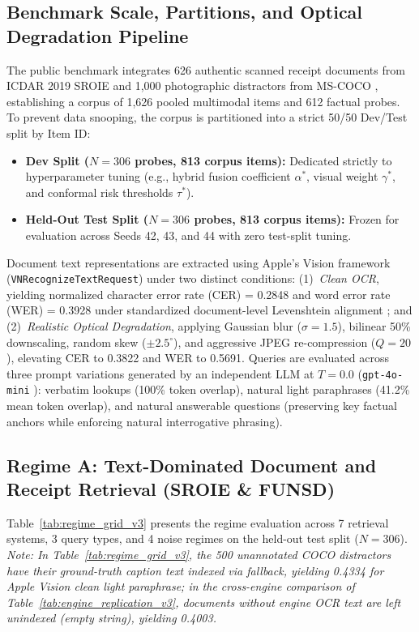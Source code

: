 \documentclass[conference]{IEEEtran}
\begin{document}
\subsection{Benchmark Scale, Partitions, and Optical Degradation Pipeline}
The public benchmark integrates 626 authentic scanned receipt documents from ICDAR 2019 SROIE \cite{huang2019sroie} and 1,000 photographic distractors from MS-COCO \cite{lin2014coco}, establishing a corpus of 1,626 pooled multimodal items and 612 factual probes. To prevent data snooping, the corpus is partitioned into a strict 50/50 Dev/Test split by Item ID:
\begin{itemize}
    \setlength{\itemsep}{0.2pt plus 0.1pt}
    \setlength{\parskip}{0pt}
    \item \textbf{Dev Split ($N=306$ probes, 813 corpus items):} Dedicated strictly to hyperparameter tuning (e.g., hybrid fusion coefficient $\alpha^*$, visual weight $\gamma^*$, and conformal risk thresholds $\tau^*$).
    \item \textbf{Held-Out Test Split ($N=306$ probes, 813 corpus items):} Frozen for evaluation across Seeds 42, 43, and 44 with zero test-split tuning.
\end{itemize}

Document text representations are extracted using Apple's Vision framework (\texttt{VNRecognizeTextRequest}) under two distinct conditions: (1)~\emph{Clean OCR}, yielding normalized character error rate (CER) = 0.2848 and word error rate (WER) = 0.3928 under standardized document-level Levenshtein alignment \cite{vaessen2024jiwer}; and (2)~\emph{Realistic Optical Degradation}, applying Gaussian blur ($\sigma=1.5$), bilinear 50\% downscaling, random skew ($\pm 2.5^\circ$), and aggressive JPEG re-compression ($Q=20$), elevating CER to 0.3822 and WER to 0.5691. Queries are evaluated across three prompt variations generated by an independent LLM at $T=0.0$ (\texttt{gpt-4o-mini} \cite{openai2024gpt4o}): verbatim lookups (100\% token overlap), natural light paraphrases (41.2\% mean token overlap), and natural answerable questions (preserving key factual anchors while enforcing natural interrogative phrasing).

\subsection{Regime A: Text-Dominated Document and Receipt Retrieval (SROIE \& FUNSD)}
\label{sec:regime_a_text}

Table~\ref{tab:regime_grid_v3} presents the regime evaluation across 7 retrieval systems, 3 query types, and 4 noise regimes on the held-out test split ($N=306$). \textit{Note: In Table~\ref{tab:regime_grid_v3}, the 500 unannotated COCO distractors have their ground-truth caption text indexed via fallback, yielding 0.4334 for Apple Vision clean light paraphrase; in the cross-engine comparison of Table~\ref{tab:engine_replication_v3}, documents without engine OCR text are left unindexed (empty string), yielding 0.4003.} 
\end{document}
